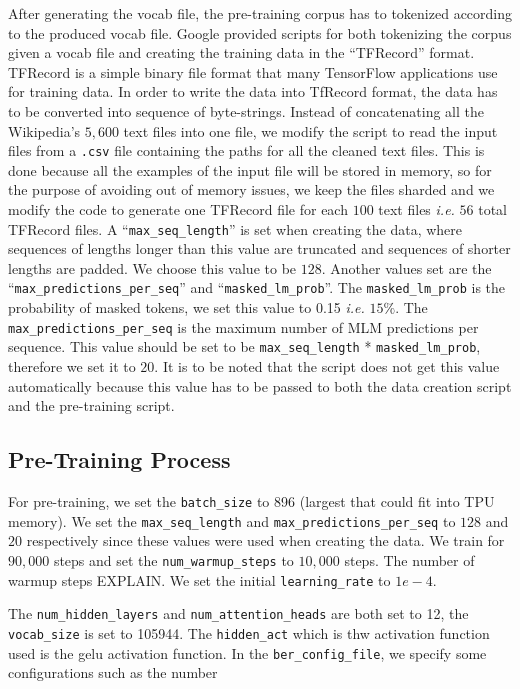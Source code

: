 After generating the vocab file, the pre-training corpus has to tokenized according to the produced vocab file. Google provided scripts for both tokenizing the corpus given a vocab file and creating the training data in the \enquote{TFRecord} format. TFRecord is a simple binary file format that many TensorFlow applications use for training data. In order to write the data into TfRecord format, the data has to be converted into sequence of byte-strings. Instead of concatenating all the Wikipedia's $5,600$ text files into one file, we modify the script to read the input files from a \texttt{.csv} file containing the paths for all the cleaned text files. This is done because all the examples of the input file will be stored in memory, so for the purpose of avoiding out of memory issues, we keep the files sharded and we modify the code to generate one TFRecord file for each $100$ text files \textit{i.e.} $56$ total TFRecord files. 
A \enquote{\texttt{max\_seq\_length}} 
is set when creating the data, where sequences of lengths longer than this value are truncated and sequences of shorter lengths are padded. We choose this value to be $128$. Another values set are the \enquote{\texttt{max\_predictions\_per\_seq}} and \enquote{\texttt{masked\_lm\_prob}}. The \texttt{masked\_lm\_prob} is the probability of masked tokens, we set this value to 0.15 \textit{i.e.} $15\%$. The \texttt{max\_predictions\_per\_seq} is the maximum number of \ac{MLM} predictions per sequence. This value should be set to be \texttt{max\_seq\_length} * \texttt{masked\_lm\_prob}, therefore we set it to $20$. It is to be noted that the script does not get this value automatically because this value has to be passed to both the data creation script and the pre-training script.
 
 
\subsection{Pre-Training Process}

For pre-training, we set the \texttt{batch\_size} to 896 (largest that could fit into \ac{TPU} memory). We set the \texttt{max\_seq\_length} and \texttt{max\_predictions\_per\_seq} to $128$ and $20$ respectively since these values were used when creating the data. We train for $90,000$ steps and set the \texttt{num\_warmup\_steps} to $10,000$ steps. The number of warmup steps EXPLAIN. We set the initial \texttt{learning\_rate} to $1e-4$.

The \texttt{num\_hidden\_layers} and \texttt{num\_attention\_heads} are both set to 12, the \texttt{vocab\_size} is set to 105944. The \texttt{hidden\_act} which is thw activation function used is the gelu activation function. 
In the \texttt{ber\_config\_file}, we specify some configurations such as the number 

